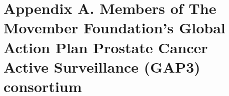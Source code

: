 \documentclass[review, 12pt]{elsarticle}
\begin{document}









\section*{Appendix A. Members of The Movember Foundation’s Global Action Plan Prostate Cancer Active Surveillance (GAP3) consortium}



\end{document}
